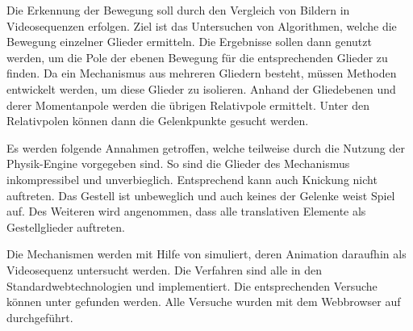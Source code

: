 Die Erkennung der Bewegung soll durch den Vergleich von Bildern in Videosequenzen erfolgen.
Ziel ist das Untersuchen von Algorithmen, welche die Bewegung einzelner Glieder ermitteln.
Die Ergebnisse sollen dann genutzt werden, um die Pole der ebenen Bewegung für die entsprechenden Glieder zu finden.
Da ein Mechanismus aus mehreren Gliedern besteht, müssen Methoden entwickelt werden, um diese Glieder zu isolieren.
Anhand der Gliedebenen und derer Momentanpole werden die übrigen Relativpole ermittelt.
Unter den Relativpolen können dann die Gelenkpunkte gesucht werden.

Es werden folgende Annahmen getroffen, welche teilweise durch die Nutzung der Physik-Engine  vorgegeben sind.
So sind die Glieder des Mechanismus inkompressibel und unverbieglich.
Entsprechend kann auch Knickung nicht auftreten.
Das Gestell ist unbeweglich und auch keines der Gelenke weist Spiel auf.
Des Weiteren wird angenommen, dass alle translativen Elemente als Gestellglieder auftreten.

Die Mechanismen werden mit Hilfe von  simuliert, deren Animation daraufhin als Videosequenz untersucht werden.
Die Verfahren sind alle in den Standardwebtechnologien  und  implementiert.
Die entsprechenden Versuche können unter  gefunden werden.
Alle Versuche wurden mit dem Webbrowser  auf  durchgeführt.
